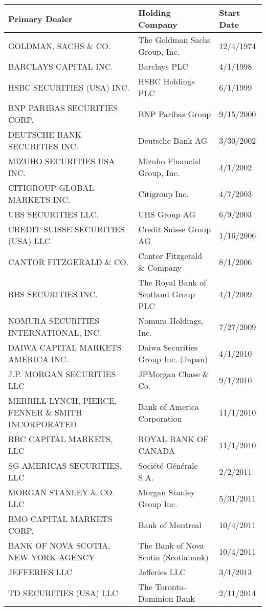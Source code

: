 \begin{tabular}{lll}
\toprule
Primary Dealer & Holding Company & Start Date \\
\midrule
GOLDMAN, SACHS \& CO.                & The Goldman Sachs Group, Inc. & 12/4/1974 \\
BARCLAYS CAPITAL INC.               & Barclays PLC & 4/1/1998 \\
HSBC SECURITIES (USA) INC.          & HSBC Holdings PLC & 6/1/1999 \\
BNP PARIBAS SECURITIES CORP.     & BNP Paribas Group & 9/15/2000 \\
DEUTSCHE BANK SECURITIES INC.    & Deutsche Bank AG & 3/30/2002 \\
MIZUHO SECURITIES USA INC.       & Mizuho Financial Group, Inc. & 4/1/2002 \\
CITIGROUP GLOBAL MARKETS INC.    & Citigroup Inc. & 4/7/2003 \\
UBS SECURITIES LLC.                 & UBS Group AG & 6/9/2003 \\
CREDIT SUISSE SECURITIES (USA) LLC     & Credit Suisse Group AG & 1/16/2006 \\
CANTOR FITZGERALD \& CO. & Cantor Fitzgerald \& Company & 8/1/2006 \\
RBS SECURITIES INC. & The Royal Bank of Scotland Group PLC & 4/1/2009 \\
NOMURA SECURITIES INTERNATIONAL, INC. & Nomura Holdings, Inc. & 7/27/2009 \\
DAIWA CAPITAL MARKETS AMERICA INC.   & Daiwa Securities Group Inc. (Japan) & 4/1/2010 \\
J.P. MORGAN SECURITIES LLC         & JPMorgan Chase \& Co. & 9/1/2010 \\
MERRILL LYNCH, PIERCE, FENNER \& SMITH INCORPORATED & Bank of America Corporation & 11/1/2010 \\
RBC CAPITAL MARKETS, LLC & ROYAL BANK OF CANADA & 11/1/2010 \\
SG AMERICAS SECURITIES, LLC & Société Générale S.A. & 2/2/2011 \\
MORGAN STANLEY \& CO. LLC & Morgan Stanley Group Inc. & 5/31/2011 \\
BMO CAPITAL MARKETS CORP.  & Bank of Montreal & 10/4/2011 \\
BANK OF NOVA SCOTIA, NEW YORK AGENCY & The Bank of Nova Scotia (Scotiabank) & 10/4/2011 \\
JEFFERIES LLC & Jefferies LLC & 3/1/2013 \\
TD SECURITIES (USA) LLC & The Toronto-Dominion Bank & 2/11/2014 \\
\bottomrule
\end{tabular}

